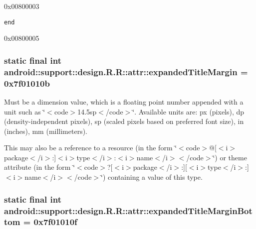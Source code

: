 0x00800003

{\tt end}

0x00800005\hypertarget{classandroid_1_1support_1_1design_1_1_r_1_1attr_a0e95268f9549c996058bf779ed1861c}{
\subsubsection[{expandedTitleMargin}]{\setlength{\rightskip}{0pt plus 5cm}static final int android::support::design.R.R::attr::expandedTitleMargin = 0x7f01010b}}
\label{classandroid_1_1support_1_1design_1_1_r_1_1attr_a0e95268f9549c996058bf779ed1861c}


Must be a dimension value, which is a floating point number appended with a unit such as \char`\"{}$<$code$>$14.5sp$<$/code$>$\char`\"{}. Available units are: px (pixels), dp (density-independent pixels), sp (scaled pixels based on preferred font size), in (inches), mm (millimeters). 

This may also be a reference to a resource (in the form \char`\"{}$<$code$>$@\mbox{[}$<$i$>$package$<$/i$>$:\mbox{]}$<$i$>$type$<$/i$>$:$<$i$>$name$<$/i$>$$<$/code$>$\char`\"{}) or theme attribute (in the form \char`\"{}$<$code$>$?\mbox{[}$<$i$>$package$<$/i$>$:\mbox{]}\mbox{[}$<$i$>$type$<$/i$>$:\mbox{]}$<$i$>$name$<$/i$>$$<$/code$>$\char`\"{}) containing a value of this type. \hypertarget{classandroid_1_1support_1_1design_1_1_r_1_1attr_ae79fb5f47836c3662439373042caa72}{
\subsubsection[{expandedTitleMarginBottom}]{\setlength{\rightskip}{0pt plus 5cm}static final int android::support::design.R.R::attr::expandedTitleMarginBottom = 0x7f01010f}}
\label{classandroid_1_1support_1_1design_1_1_r_1_1attr_ae79fb5f47836c3662439373042caa72}


